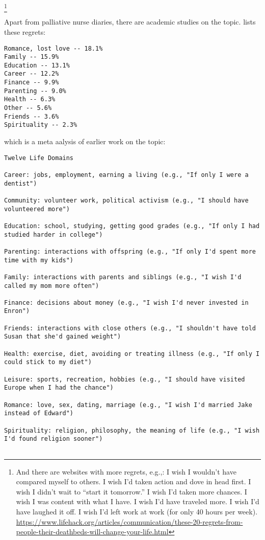\documentclass[10pt, letterpaper]{article}
\begin{document}
\begin{spacing}{1.8}
\footnote{And there are websites with more regrets, e.g.,:
I wish I wouldn't have compared myself to others.
I wish I'd taken action and dove in head first.
I wish I didn't wait to ``start it tomorrow.''
I wish I'd taken more chances.
I wish I was content with what I have.
I wish I'd have traveled more.
I wish I'd have laughed it off.
I wish I'd left work at work (for only 40 hours per week).
\url{https://www.lifehack.org/articles/communication/these-20-regrets-from-people-their-deathbeds-will-change-your-life.html}
}

Apart from palliative nurse diaries, there are  academic studies on
the topic. \citet{morrison11b} lists these regrets:

\begin{verbatim}
Romance, lost love -- 18.1%
Family -- 15.9%
Education -- 13.1%
Career -- 12.2%
Finance -- 9.9%
Parenting -- 9.0%
Health -- 6.3%
Other -- 5.6%
Friends -- 3.6%
Spirituality -- 2.3%
\end{verbatim}

\citet{roese05} which is a meta aalysis of earlier work on the topic:
\begin{verbatim}
Twelve Life Domains

Career: jobs, employment, earning a living (e.g., "If only I were a dentist")

Community: volunteer work, political activism (e.g., "I should have volunteered more")

Education: school, studying, getting good grades (e.g., "If only I had studied harder in college")

Parenting: interactions with offspring (e.g., "If only I'd spent more time with my kids")

Family: interactions with parents and siblings (e.g., "I wish I'd called my mom more often")

Finance: decisions about money (e.g., "I wish I'd never invested in Enron")

Friends: interactions with close others (e.g., "I shouldn't have told Susan that she'd gained weight")

Health: exercise, diet, avoiding or treating illness (e.g., "If only I could stick to my diet")

Leisure: sports, recreation, hobbies (e.g., "I should have visited Europe when I had the chance")

Romance: love, sex, dating, marriage (e.g., "I wish I'd married Jake instead of Edward")

Spirituality: religion, philosophy, the meaning of life (e.g., "I wish I'd found religion sooner")


\end{verbatim}
\end{spacing}
\end{document}
